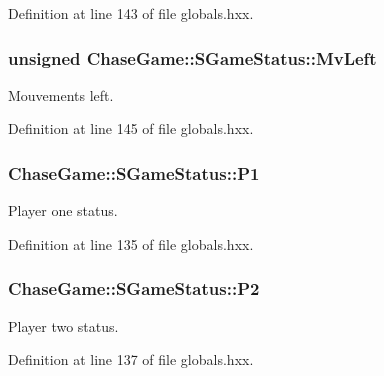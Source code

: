 Definition at line 143 of file globals.\-hxx.

\hypertarget{struct_chase_game_1_1_s_game_status_ae06758bdc7c2bda68801afd314837532}{
\subsubsection[{Mv\-Left}]{\setlength{\rightskip}{0pt plus 5cm}unsigned Chase\-Game\-::\-S\-Game\-Status\-::\-Mv\-Left}}\label{struct_chase_game_1_1_s_game_status_ae06758bdc7c2bda68801afd314837532}


Mouvements left. 



Definition at line 145 of file globals.\-hxx.

\hypertarget{struct_chase_game_1_1_s_game_status_ae939192c0ce625f9cbec50549ec88fac}{
\subsubsection[{P1}]{ Chase\-Game\-::\-S\-Game\-Status\-::\-P1}}\label{struct_chase_game_1_1_s_game_status_ae939192c0ce625f9cbec50549ec88fac}


Player one status. 



Definition at line 135 of file globals.\-hxx.

\hypertarget{struct_chase_game_1_1_s_game_status_a21840b6b133cd5a73d5c0cd3b01116e2}{
\subsubsection[{P2}]{ Chase\-Game\-::\-S\-Game\-Status\-::\-P2}}\label{struct_chase_game_1_1_s_game_status_a21840b6b133cd5a73d5c0cd3b01116e2}


Player two status. 



Definition at line 137 of file globals.\-hxx.

